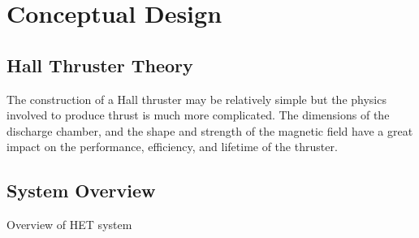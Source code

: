\chapter{Conceptual Design}

\section{Hall Thruster Theory}

The construction of a Hall thruster may be relatively simple but the physics involved to produce thrust is much more complicated. The dimensions of the discharge chamber, and the shape and strength of the magnetic field have a great impact on the performance, efficiency, and lifetime of the thruster.





\section{System Overview}

Overview of HET system